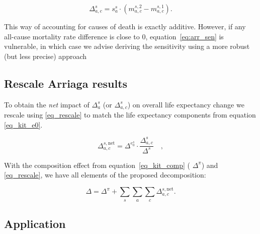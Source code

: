 \documentclass[12pt, sn-apa,pdflatex,letterpaper]{sn-jnl}
\begin{document}
\begin{equation}
\label{eq:arr_mxc}
\Delta_{a,c}^s = s_a^s \cdot \left( m_{a,c}^{s,2} - m_{a,c}^{s,1}\right)\textrm{.}
\end{equation}

This way of accounting for causes of death is exactly additive. However, if any all-cause mortality rate difference is close to 0, equation~\eqref{eq:arr_sen} is vulnerable, in which case we advise deriving the sensitivity using a more robust (but less precise) approach \citep{coddecomp}

\subsection*{Rescale Arriaga results}\label{rescale-arriaga-results}

 To obtain the \emph{net} impact of $\Delta_a^s$ (or $\Delta_{a,c}^s$) on overall life expectancy change we rescale using \eqref{eq_rescale} to match the life expectancy components from equation \eqref{eq_kit_e0}.

\begin{equation}
\label{eq_rescale}
\Delta_{a,c}^{s,\text{net}} = \Delta^{e_0^s} \cdot \frac{\Delta_{a,c}^s}{\Delta^s} \quad \mathrm{,}
\end{equation}

With the composition effect from equation~\eqref{eq_kit_comp} ( $\Delta^\pi$) and \eqref{eq_rescale}, we have all elements of the proposed decomposition:

\begin{equation}
\label{eq_full}
\Delta = \Delta^\pi + \sum_s \sum_a \sum_c\Delta_{a,c}^{s,\mathrm{net}}\mathrm{.}
\end{equation}


\subsection*{Application}\label{rescale-arriaga-results}
\end{document}

